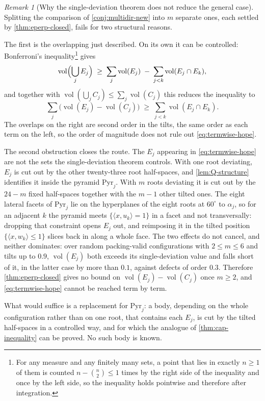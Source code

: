 \documentclass[11pt,reqno]{amsart}
\renewcommand{\_}{\origunderscore\allowbreak}
\numberwithin{equation}{section}
\theoremstyle{plain}
\theoremstyle{definition}
\theoremstyle{remark}
\newtheorem{remark}[thm]{Remark}
\newcommand{\base}{u}                        %
\DeclareMathOperator{\vol}{vol}
\begin{document}
\begin{remark}[Why the single-deviation theorem does not reduce the general case]\label{rem:first-order-obstruction}
Splitting the comparison of \cref{conj:multidir-new} into $m$ separate
ones, each settled by \cref{thm:eperp-closed}, fails for two structural
reasons.

The first is the overlapping just described. On its own it can be controlled:
Bonferroni's inequality\footnote{For any measure and any finitely many sets,
  a point that lies in exactly $n\ge1$ of them is counted
  $n-\binom n2\le1$ times by the right side of the inequality and once by
  the left side, so the inequality holds pointwise and therefore after
  integration.} gives
\[
  \vol\Bigl(\bigcup_{j}E_j\Bigr)\;\ge\;\sum_j\vol(E_j)
  \;-\;\sum_{j<k}\vol(E_j\cap E_k),
\]
and together with $\vol(\bigcup_jC_j)\le\sum_j\vol(C_j)$ this reduces
the inequality to
\begin{equation}\label{eq:termwise-hope}
  \sum_j\bigl(\vol(E_j)-\vol(C_j)\bigr)\;\ge\;\sum_{j<k}\vol(E_j\cap E_k).
\end{equation}
The overlaps on the right are second order in the tilts, the same order
as each term on the left, so the order of magnitude does not rule
out \eqref{eq:termwise-hope}.

The second obstruction closes the route. The $E_j$ appearing in
\eqref{eq:termwise-hope} are not the sets the single-deviation theorem
controls. With one root deviating, $E_j$ is cut out by the other
twenty-three root half-spaces, and \cref{lem:Q-structure} identifies
it inside the pyramid $\mathrm{Pyr}_j$. With $m$ roots deviating it is
cut out by the $24-m$ fixed half-spaces together with the $m-1$ other
tilted ones. The eight lateral facets of
$\mathrm{Pyr}_j$ lie on the hyperplanes of the eight roots at $60^\circ$
to $\alpha_j$, so for an adjacent $k$ the pyramid meets $\{\langle
x,\base_k\rangle=1\}$ in a facet and not transversally: dropping
that constraint opens $E_j$ out, and reimposing it in the tilted
position $\{\langle x,w_k\rangle\le1\}$ slices back in along a whole
face. The two effects do not cancel, and neither dominates: over random
packing-valid configurations with $2\le m\le6$ and tilts up to $0.9$,
$\vol(E_j)$ both exceeds its single-deviation value and falls short of
it, in the latter case by more than $0.1$, against defects of order
$0.3$. Therefore \cref{thm:eperp-closed} gives no bound
on $\vol(E_j)-\vol(C_j)$ once $m\ge2$, and \eqref{eq:termwise-hope}
cannot be reached term by term.

What would suffice is a replacement for $\mathrm{Pyr}_j$: a body,
depending on the whole configuration rather than on one root, that
contains each $E_j$, is cut by the tilted half-spaces in a controlled
way, and for which the analogue of \cref{thm:cap-inequality} can be
proved. No such body is known.
\end{remark}
\end{document}
